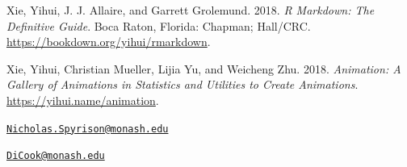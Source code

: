 \leavevmode\hypertarget{ref-xie_r_2018}{}%
Xie, Yihui, J. J. Allaire, and Garrett Grolemund. 2018. \emph{R Markdown: The Definitive Guide}. Boca Raton, Florida: Chapman; Hall/CRC. \url{https://bookdown.org/yihui/rmarkdown}.

\leavevmode\hypertarget{ref-xie_animation:_2018}{}%
Xie, Yihui, Christian Mueller, Lijia Yu, and Weicheng Zhu. 2018. \emph{Animation: A Gallery of Animations in Statistics and Utilities to Create Animations}. \url{https://yihui.name/animation}.



\address{%
Nicholas Spyrison\\
Monash University\\
School of Information Technology\\ Monash University, Melbourne, VIC 3800, Australia\\
}
\href{mailto:Nicholas.Spyrison@monash.edu}{\nolinkurl{Nicholas.Spyrison@monash.edu}}

\address{%
Dianne Cook\\
Monash University\\
School of Econometrics and Business Statistics\\ Monash University, Melbourne, VIC 3800, Australia\\
}
\href{mailto:DiCook@monash.edu}{\nolinkurl{DiCook@monash.edu}}

